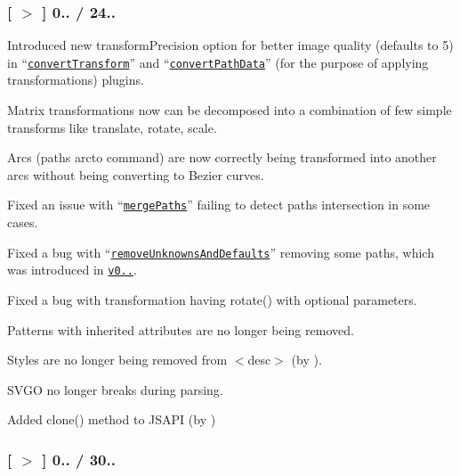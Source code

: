 \subsubsection*{\mbox{[} \href{https://github.com/svg/svgo/tree/v0.5.2}{\tt $>$} \mbox{]} 0.. / 24..}


\begin{DoxyItemize}
\item Introduced new {\ttfamily transform\+Precision} option for better image quality (defaults to 5) in “\href{https://github.com/svg/svgo/blob/master/plugins/convertTransform.js}{\tt convert\+Transform}” and “\href{https://github.com/svg/svgo/blob/master/plugins/convertPathData.js}{\tt convert\+Path\+Data}” (for the purpose of applying transformations) plugins.
\item Matrix transformations now can be decomposed into a combination of few simple transforms like {\ttfamily translate}, {\ttfamily rotate}, {\ttfamily scale}.
\item Arcs (paths {\ttfamily arcto} command) are now correctly being transformed into another arcs without being converting to Bezier curves.
\item Fixed an issue with “\href{https://github.com/svg/svgo/blob/master/plugins/mergePaths.js}{\tt merge\+Paths}” failing to detect paths intersection in some cases.
\item Fixed a bug with “\href{https://github.com/svg/svgo/blob/master/plugins/removeUnknownsAndDefaults.js}{\tt remove\+Unknowns\+And\+Defaults}” removing some paths, which was introduced in \href{https://github.com/svg/svgo/tree/v0.5.1}{\tt v0..}.
\item Fixed a bug with transformation having {\ttfamily rotate()} with optional parameters.
\item Patterns with inherited attributes are no longer being removed.
\item Styles are no longer being removed from {\ttfamily $<$desc$>$} (by ).
\item S\+V\+GO no longer breaks during parsing.
\item Added {\ttfamily clone()} method to J\+S\+A\+PI (by )
\end{DoxyItemize}

\subsubsection*{\mbox{[} \href{https://github.com/svg/svgo/tree/v0.5.1}{\tt $>$} \mbox{]} 0.. / 30..}


